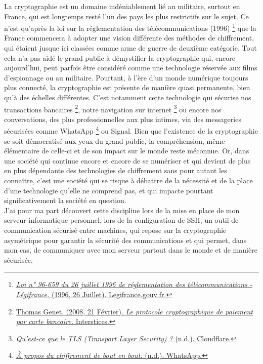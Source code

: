 \documentclass{article}
\begin{document}
\hspace{2em} La cryptographie est un domaine indéniablement lié au militaire, surtout en France, qui est longtemps resté l'un des pays les plus restrictifs sur le sujet. Ce n'est qu'après la loi sur la réglementation des télécommunications (1996)
\footnote{\href{https://www.legifrance.gouv.fr/loda/id/JORFTEXT000000733177}{\textit{Loi n° 96-659 du 26 juillet 1996 de réglementation des télécommunications - Légifrance.} (1996, 26 Juillet). Legifrance.gouv.fr.}}
que la France commencera à adopter une vision différente des méthodes de chiffrement, qui étaient jusque ici classées comme arme de guerre de deuxième catégorie. Tout cela n'a pas aidé le grand public à démystifier la cryptographie qui, encore aujourd'hui, peut parfois être considéré comme une technologie réservée aux films d'espionnage ou au militaire. Pourtant, à l'ère d'un monde numérique toujours plus connecté, la cryptographie est présente de manière quasi permanente, bien qu'à des échelles différentes. C'est notamment cette technologie qui sécurise nos transactions bancaires
\footnote{\href{https://interstices.info/le-protocole-cryptographique-de-paiement-par-carte-bancaire/}{Thomas Genet. (2008, 21 Février). \textit{Le protocole cryptographique de paiement par carte bancaire.} Interstices.}},
notre navigation sur internet
\footnote{\href{https://www.cloudflare.com/fr-fr/learning/ssl/transport-layer-security-tls/}{\textit{Qu’est-ce que le TLS (Transport Layer Security) ?} (n.d.). Cloudflare.}}
ou encore nos conversations, des plus professionnelles aux plus intimes, via des messageries sécurisées comme WhatsApp
\footnote{\href{https://faq.whatsapp.com/820124435853543}{\textit{À propos du chiffrement de bout en bout.} (n.d.). WhatsApp.}}
ou Signal.
Bien que l'existence de la cryptographie se soit démocratisé aux yeux du grand public, la compréhension, même élémentaire de celle-ci et de son  impact sur le monde reste méconnue. Or, dans une société qui continue encore et encore de se numériser et qui devient de plus en plus dépendante des technologies de chiffrement sans pour autant les connaître, c'est une société qui se risque à débattre de la nécessité et de la place d'une technologie qu'elle ne comprend pas, et qui impacte pourtant significativement la société en question.  \\

J'ai pour ma part découvert cette discipline lors de la mise en place de mon serveur informatique personnel, lors de la configuration de SSH, un outil de communication sécurisé entre machines, qui repose sur la cryptographie asymétrique pour garantir la sécurité des communications et qui permet, dans mon cas, de communiquer avec mon serveur partout dans le monde et de manière sécurisée. \\
\end{document}
